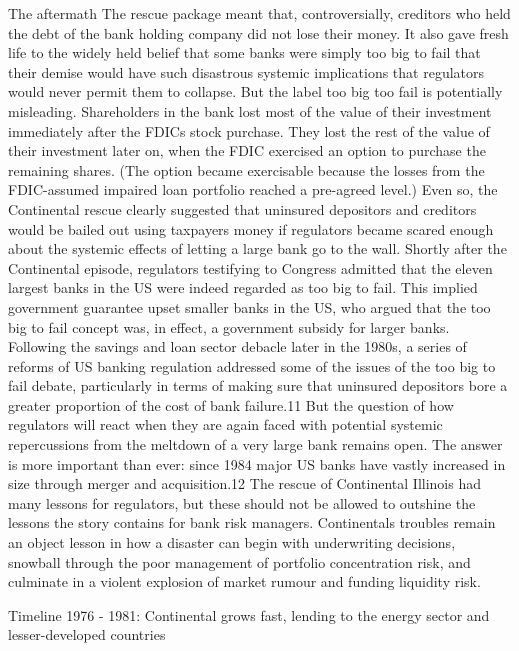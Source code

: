 The aftermath
The rescue package meant that, controversially, creditors who held the debt of the bank holding company did not lose their money. It also gave fresh life to the widely held belief that some banks were simply too big to fail that their demise would have such disastrous systemic implications that regulators would never permit them to collapse.
But the label too big too fail is potentially misleading. Shareholders in the bank lost most of the value of their investment immediately after the FDICs stock purchase. They lost the rest of the value of their investment later on, when the FDIC exercised an option to purchase the remaining shares. (The option became exercisable because the losses from the FDIC-assumed impaired loan portfolio reached a pre-agreed level.) 
Even so, the Continental rescue clearly suggested that uninsured depositors and creditors would be bailed out using taxpayers money if regulators became scared enough about the systemic effects of letting a large bank go to the wall. Shortly after the Continental episode, regulators testifying to Congress admitted that the eleven largest banks in the US were indeed regarded as too big to fail.
This implied government guarantee upset smaller banks in the US, who argued that the too big to fail concept was, in effect, a government subsidy for larger banks. Following the savings and loan sector debacle later in the 1980s, a series of reforms of US banking regulation addressed some of the issues of the too big to fail debate, particularly in terms of making sure that uninsured depositors bore a greater proportion of the cost of bank failure.11   
But the question of how regulators will react when they are again faced with potential systemic repercussions from the meltdown of a very large bank remains open. The answer is more important than ever: since 1984 major US banks have vastly increased in size through merger and acquisition.12  
The rescue of Continental Illinois had many lessons for regulators, but these should not be allowed to outshine the lessons the story contains for bank risk managers. Continentals troubles remain an object lesson in how a disaster can begin with underwriting decisions, snowball through the poor management of portfolio concentration risk, and culminate in a violent explosion of market rumour and funding liquidity risk.  
	
Timeline
1976 - 1981: Continental grows fast, lending to the energy sector and lesser-developed countries

